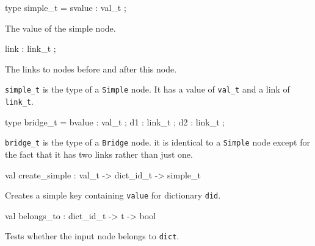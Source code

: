 \documentclass[11pt]{article}
\begin{document}
\label{type:Key.simple-underscoret}\begin{ocamldoccode}
type simple_t = {}
  svalue : val_t ;
\end{ocamldoccode}
\begin{ocamldoccomment}
The value of the simple node.
\end{ocamldoccomment}
\begin{ocamldoccode}
  link : link_t ;
\end{ocamldoccode}
\begin{ocamldoccomment}
The links to nodes before and after
                this node.
\end{ocamldoccomment}
\begin{ocamldoccode}
{}
\end{ocamldoccode}
\begin{ocamldocdescription}
{\tt{simple\_t}} is the type of a {\tt{Simple}} node. It has a value of {\tt{val\_t}}
     and a link of {\tt{link\_t}}.


\end{ocamldocdescription}




\label{type:Key.bridge-underscoret}\begin{ocamldoccode}
type bridge_t = {}
  bvalue : val_t ;
  d1 : link_t ;
  d2 : link_t ;
{}
\end{ocamldoccode}
\begin{ocamldocdescription}
{\tt{bridge\_t}} is the type of a {\tt{Bridge}} node. it is identical to a
    {\tt{Simple}} node except for the fact that it has two links rather than
    just one.


\end{ocamldocdescription}




\label{val:Key.create-underscoresimple}\begin{ocamldoccode}
val create_simple : val_t -> dict_id_t -> simple_t
\end{ocamldoccode}
\begin{ocamldocdescription}
Creates a simple key containing {\tt{value}} for dictionary {\tt{did}}.


\end{ocamldocdescription}




\label{val:Key.belongs-underscoreto}\begin{ocamldoccode}
val belongs_to : dict_id_t -> t -> bool
\end{ocamldoccode}
\begin{ocamldocdescription}
Tests whether the input node belongs to {\tt{dict}}.


\end{ocamldocdescription}
\end{document}
